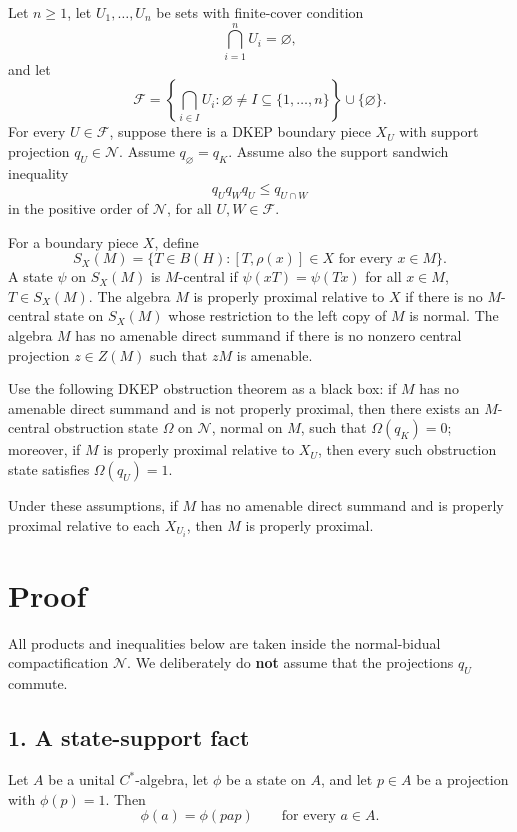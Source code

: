 \documentclass[12pt]{article}
\begin{document}
Let \(n\ge 1\), let \(U_1,\dots,U_n\) be sets with finite-cover condition
\[
\bigcap_{i=1}^n U_i=\varnothing,
\]
and let
\[
\mathcal F=\left\{\bigcap_{i\in I}U_i:\varnothing\ne I\subseteq\{1,\dots,n\}\right\}\cup\{\varnothing\}.
\]
For every \(U\in\mathcal F\), suppose there is a DKEP boundary piece \(X_U\) with support projection \(q_U\in\mathcal N\). Assume \(q_{\varnothing}=q_K\). Assume also the support sandwich inequality
\[
q_Uq_Wq_U\le q_{U\cap W}
\]
in the positive order of \(\mathcal N\), for all \(U,W\in\mathcal F\).

For a boundary piece \(X\), define
\[
S_X(M)=\{T\in B(H):[T,\rho(x)]\in X\text{ for every }x\in M\}.
\]
A state \(\psi\) on \(S_X(M)\) is \(M\)-central if \(\psi(xT)=\psi(Tx)\) for all \(x\in M\), \(T\in S_X(M)\). The algebra \(M\) is properly proximal relative to \(X\) if there is no \(M\)-central state on \(S_X(M)\) whose restriction to the left copy of \(M\) is normal. The algebra \(M\) has no amenable direct summand if there is no nonzero central projection \(z\in Z(M)\) such that \(zM\) is amenable.

Use the following DKEP obstruction theorem as a black box: if \(M\) has no amenable direct summand and is not properly proximal, then there exists an \(M\)-central obstruction state \(\Omega\) on \(\mathcal N\), normal on \(M\), such that \(\Omega(q_K)=0\); moreover, if \(M\) is properly proximal relative to \(X_U\), then every such obstruction state satisfies \(\Omega(q_U)=1\).

Under these assumptions, if \(M\) has no amenable direct summand and is properly proximal relative to each \(X_{U_i}\), then \(M\) is properly proximal.

\section*{Proof}

All products and inequalities below are taken inside the normal-bidual compactification \(\mathcal N\). We deliberately do \textbf{not} assume that the projections \(q_U\) commute.

\subsection*{1. A state-support fact}

Let \(A\) be a unital \(C^*\)-algebra, let \(\phi\) be a state on \(A\), and let \(p\in A\) be a projection with \(\phi(p)=1\). Then
\[
\phi(a)=\phi(pap)
\qquad\text{for every }a\in A.
\]
\end{document}

